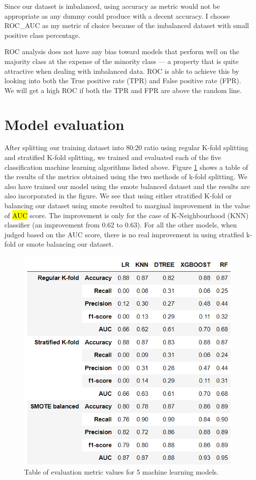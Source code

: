 Since our dataset is imbalanced, using accuracy as metric would not be appropriate as any dummy could produce with a decent accuracy. I choose ROC_AUC as my metric of choice because of the imbalanced dataset with small positive class percentage. 

ROC analysis does not have any bias toward models that perform well on the majority class at the expense of the minority class — a property that is quite attractive when dealing with imbalanced data.
ROC is able to achieve this by looking into both the True positive rate (TPR) and False positive rate (FPR). We will get a high ROC if both the TPR and FPR are above the random line.


\section{Model evaluation}
After splitting our training dataset into 80:20 ratio using regular K-fold splitting and stratified K-fold splitting, we trained and evaluated each of the five classification machine learning algorithms listed above. Figure \ref{fig:kfold_metric} shows a table of the results of the metrics obtained using the two methods of k-fold splitting. We also have trained our model using the smote balanced dataset and the results are also incorporated in the figure. 
We see that using either stratified K-fold or balancing our dataset using smote resulted to marginal improvement in the value of \hl{AUC} score. The improvement is only for the case of K-Neighbourhood (KNN) classifier (an improvement from 0.62 to 0.63). For all the other models, when judged based on the AUC score, there is no real improvement in using stratfied k-fold or smote balancing our dataset.  

\begin{figure}[tbh]
\centering
\includegraphics[width = 1.0\hsize]{./resources/img/fig_eval_metrics_kfold_and_smote.png}
\caption{Table of evaluation metric values for 5 machine learning models.} 
\label{fig:kfold_metric}
\end{figure}

